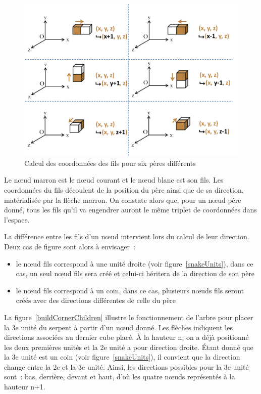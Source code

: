 \begin{figure}[h]
 \centering
 \includegraphics[scale=0.5,keepaspectratio=true]{img/buildChildren.png}
 \caption{Calcul des coordonnées des fils pour six pères différents}
 \label{buildChildren}
\end{figure}

\newpage

Le nœud marron est le nœud courant et le nœud blanc est son fils. Les coordonnées du fils découlent de la position du père ainsi que de sa direction, matérialisée par la flèche marron. On constate alors que, pour un nœud père donné, tous les fils qu’il va engendrer auront le même triplet de coordonnées dans l’espace.


La différence entre les fils d’un nœud intervient lors du calcul de leur direction. Deux cas de figure sont alors à envisager :
\begin{itemize}
 \item le nœud fils correspond à une unité droite (voir figure~\ref{snakeUnits}), dans ce cas, un seul nœud fils sera créé et celui-ci héritera de la direction de son père
 \item le nœud fils correspond à un coin, dans ce cas, plusieurs nœuds fils seront créés avec des directions différentes de celle du père
\end{itemize}

La figure~\ref{buildCornerChildren} illustre le fonctionnement de l’arbre pour placer la 3e unité du serpent à partir d’un nœud donné. Les flèches indiquent les directions associées au dernier cube placé. À la hauteur n, on a déjà positionné les deux premières unités et la 2e unité a pour direction droite.  Étant donné que la 3e unité est un coin (voir figure~\ref{snakeUnits}), il convient que la direction change entre la 2e et la 3e unité. Ainsi, les directions possibles pour la 3e unité sont : bas, derrière, devant et haut, d’où les quatre nœuds représentés à la hauteur n+1.


